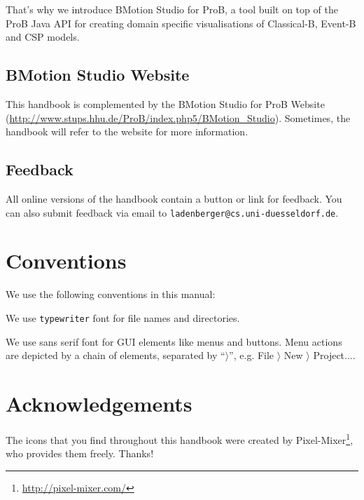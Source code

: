\documentclass[12pt]{book}
\begin{document}
That's why we introduce BMotion Studio for ProB, a tool built on top of the ProB Java API for creating domain specific visualisations of Classical-B, Event-B and CSP models.

\subsection{BMotion Studio Website}
\label{rodin_wiki}

This handbook is complemented by the BMotion Studio for ProB Website (\url{http://www.stups.hhu.de/ProB/index.php5/BMotion_Studio}).  Sometimes, the handbook will refer to the website for more information.

\subsection{Feedback}
\label{feedback}

All online versions of the handbook contain a button or link for feedback.  You can also submit feedback via email to \texttt{ladenberger@cs.uni-duesseldorf.de}.

\section{Conventions}
\label{conventions}

We use the following conventions in this manual:


We use \texttt{typewriter} font for file names and directories.

We use \textsf{sans serif font} for GUI elements like menus and buttons.  Menu actions are depicted by a chain of elements, separated by ``$\rangle$'', e.g. \textsf{File $\rangle$ New $\rangle$ Project...}.

\section{Acknowledgements}
\label{sec:acknowledgements}

The icons that you find throughout this handbook were created by Pixel-Mixer\footnote{\url{http://pixel-mixer.com/}}, who provides them freely.  Thanks!
\end{document}
